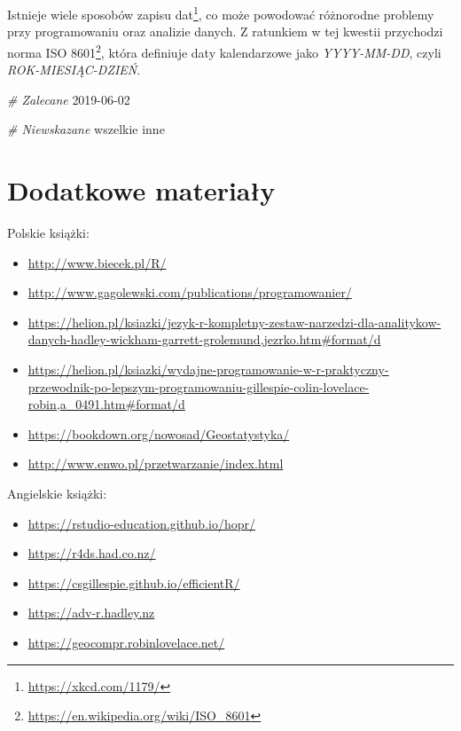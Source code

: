 \documentclass[paper=6in:9in,pagesize=pdftex,headinclude=on,footinclude=on,10pt]{scrbook}
\newenvironment{Shaded}{\begin{snugshade}}{\end{snugshade}}
\newcommand{\CommentTok}[1]{\textcolor[rgb]{0.56,0.35,0.01}{\textit{#1}}}
\newcommand{\DecValTok}[1]{\textcolor[rgb]{0.00,0.00,0.81}{#1}}
\newcommand{\NormalTok}[1]{#1}
\DeclareRobustCommand{\href}[2]{#2\footnote{\url{#1}}}
\providecommand{\tightlist}{%
  \setlength{\itemsep}{0pt}\setlength{\parskip}{0pt}}
\begin{document}
Istnieje wiele sposobów zapisu dat\footnote{\url{https://xkcd.com/1179/}}, co może powodować różnorodne problemy przy programowaniu oraz analizie danych.
Z ratunkiem w tej kwestii przychodzi norma \href{https://en.wikipedia.org/wiki/ISO_8601}{ISO 8601}, która definiuje daty kalendarzowe jako \emph{YYYY-MM-DD}, czyli \emph{ROK-MIESIĄC-DZIEŃ}.

\begin{Shaded}
\begin{Highlighting}[]
\CommentTok{# Zalecane}
\DecValTok{2019-06-02}

\CommentTok{# Niewskazane}
\NormalTok{wszelkie inne}
\end{Highlighting}
\end{Shaded}

\hypertarget{resources}{%
\section{Dodatkowe materiały}\label{resources}}

Polskie książki:

\begin{itemize}
\tightlist
\item
  \url{http://www.biecek.pl/R/} \citep{biecekPrzewodnikPoPakiecie2014}
\item
  \url{http://www.gagolewski.com/publications/programowanier/} \citep{gagolewski2016programowanie}
\item
  \url{https://helion.pl/ksiazki/jezyk-r-kompletny-zestaw-narzedzi-dla-analitykow-danych-hadley-wickham-garrett-grolemund,jezrko.htm\#format/d} \citep{wickham2016r}
\item
  \url{https://helion.pl/ksiazki/wydajne-programowanie-w-r-praktyczny-przewodnik-po-lepszym-programowaniu-gillespie-colin-lovelace-robin,a_0491.htm\#format/d} \citep{gillespie2016efficient}
\item
  \url{https://bookdown.org/nowosad/Geostatystyka/} \citep{nowosadGeostatystyka2019}
\item
  \url{http://www.enwo.pl/przetwarzanie/index.html} \citep{czerneckiMetodyPrzetwarzaniaDanych2018}
\end{itemize}

Angielskie książki:

\begin{itemize}
\tightlist
\item
  \url{https://rstudio-education.github.io/hopr/} \citep{grolemund2014hands}
\item
  \url{https://r4ds.had.co.nz/} \citep{wickham2016r}
\item
  \url{https://csgillespie.github.io/efficientR/} \citep{gillespie2016efficient}
\item
  \url{https://adv-r.hadley.nz} \citep{wickham2014advanced}
\item
  \url{https://geocompr.robinlovelace.net/} \citep{lovelace2019geocomputation}
\end{itemize}
\end{document}
